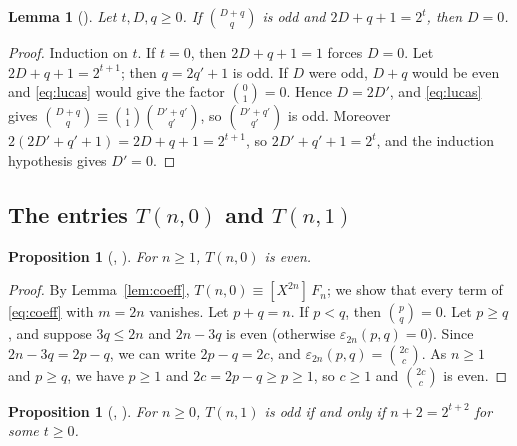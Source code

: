 \documentclass[11pt]{amsart}
\theoremstyle{plain}
\newtheorem{lemma}[theorem]{Lemma}
\newtheorem{proposition}[theorem]{Proposition}
\theoremstyle{definition}
\newcommand{\co}[2]{[X^{#1}]\,#2}
\begin{document}
\begin{lemma}[]\label{lem:dzero}
Let $t,D,q\ge0$. If $\binom{D+q}{q}$ is odd and $2D+q+1=2^t$, then $D=0$.
\end{lemma}

\begin{proof}
Induction on $t$. If $t=0$, then $2D+q+1=1$ forces $D=0$. Let $2D+q+1=2^{t+1}$; then $q=2q'+1$ is odd. If $D$ were odd, $D+q$ would be even and \eqref{eq:lucas} would give the factor $\binom01=0$. Hence $D=2D'$, and \eqref{eq:lucas} gives $\binom{D+q}{q}\equiv\binom11\binom{D'+q'}{q'}$, so $\binom{D'+q'}{q'}$ is odd. Moreover $2(2D'+q'+1)=2D+q+1=2^{t+1}$, so $2D'+q'+1=2^t$, and the induction hypothesis gives $D'=0$.
\end{proof}

\subsection{\texorpdfstring{The entries $T(n,0)$ and $T(n,1)$}{The entries T(n,0) and T(n,1)}}

\begin{proposition}[, ]\label{prop:T0}
For $n\ge1$, $T(n,0)$ is even.
\end{proposition}

\begin{proof}
By Lemma~\ref{lem:coeff}, $T(n,0)\equiv\co{2n}{F_n}$; we show that every term of \eqref{eq:coeff} with $m=2n$ vanishes. Let $p+q=n$. If $p<q$, then $\binom pq=0$. Let $p\ge q$, and suppose $3q\le 2n$ and $2n-3q$ is even (otherwise $\varepsilon_{2n}(p,q)=0$). Since $2n-3q=2p-q$, we can write $2p-q=2c$, and $\varepsilon_{2n}(p,q)=\binom{2c}{c}$. As $n\ge1$ and $p\ge q$, we have $p\ge1$ and $2c=2p-q\ge p\ge1$, so $c\ge1$ and $\binom{2c}{c}$ is even.
\end{proof}

\begin{proposition}[, ]\label{prop:T1}
For $n\ge0$, $T(n,1)$ is odd if and only if $n+2=2^{t+2}$ for some $t\ge0$.
\end{proposition}
\end{document}
